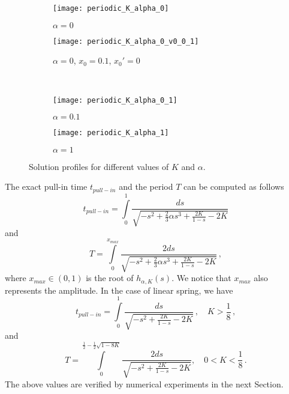 \documentclass[review]{elsarticle}
\begin{document}
\begin{figure}[htb]
\begin{center}
\begin{subfigure}[htb]{0.40\textwidth}
 \begin{center}
    \texttt{[image: periodic\_K\_alpha\_0]}
    \caption{$\alpha=0$}
  \end{center}
   \end{subfigure}\qquad
\begin{subfigure}[htb]{0.40\textwidth}
 \begin{center}
    \texttt{[image: periodic\_K\_alpha\_0\_v0\_0\_1]}
    \caption{$\alpha=0$, $x_0=0.1$, $x_0'=0$ }
  \end{center}
\end{subfigure}\\[2ex]
\begin{subfigure}[htb]{0.40\textwidth}
  \begin{center}
    \texttt{[image: periodic\_K\_alpha\_0\_1]}
    \caption{$\alpha=0.1$}
  \end{center}
\end{subfigure}\qquad
\begin{subfigure}[htb]{0.40\textwidth}
  \begin{center}
    \texttt{[image: periodic\_K\_alpha\_1]}
    \caption{$\alpha=1$}
  \end{center}
\end{subfigure}
\caption{Solution profiles for different values of $K$ and $\alpha$.}\label{fig_plots}
  \end{center}
\end{figure}
The exact pull-in time $t_{pull-in}$ and the period $T$ can be computed as follows
\begin{equation*}
t_{pull-in}=\int\limits_{0}^1\frac{ds}{\sqrt{-s^2+\frac{2}{3}\alpha s^3+\frac{2K}{1-s}-2K}}
\end{equation*}
and
\begin{equation*}
T=\int\limits_{0}^{x_{max}}\frac{2ds}{\sqrt{-s^2+\frac{2}{3}\alpha s^3+\frac{2K}{1-s}-2K}}\,,
\end{equation*}
where $x_{max}\in (0,1)$ is the root of $h_{\alpha,K}(s)$. We notice that $x_{max}$ also represents the amplitude. In the case of linear spring, we have
\begin{equation*}
t_{pull-in}=\int\limits_{0}^1\frac{ds}{\sqrt{-s^2+\frac{2K}{1-s}-2K}}\,,\quad K>\frac{1}{8}\,,
\end{equation*}
and
\begin{equation*}
T=\int\limits_{0}^{\frac{1}{2}-\frac{1}{2}\sqrt{1-8K}}\frac{2ds}{\sqrt{-s^2+\frac{2K}{1-s}-2K}},\quad 0<K<\frac{1}{8}\,.
\end{equation*}
The above values are verified by numerical experiments in the next Section.
\end{document}
